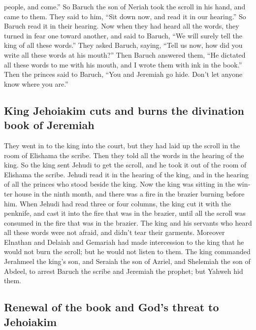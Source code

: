 \begin{paracol}{2}
\begin{otherlanguage}{english}
people, and come.'' So Baruch the son of Neriah took the scroll in his
hand, and came to them.  They said to him, ``Sit down
now, and read it in our hearing.'' So Baruch read it in their hearing.
 Now when they had heard all the words, they turned in
fear one toward another, and said to Baruch, ``We will surely tell the
king of all these words.''  They asked Baruch, saying,
``Tell us now, how did you write all these words at his mouth?''
 Then Baruch answered them, ``He dictated all these words
to me with his mouth, and I wrote them with ink in the book.''
 Then the princes said to Baruch, ``You and Jeremiah go
hide. Don't let anyone know where you are.''

\hypertarget{king-jehoiakim-cuts-and-burns-the-divination-book-of-jeremiah}{%
\subsection{King Jehoiakim cuts and burns the divination book of
Jeremiah}\label{king-jehoiakim-cuts-and-burns-the-divination-book-of-jeremiah}}

 They went in to the king into the court, but they had
laid up the scroll in the room of Elishama the scribe. Then they told
all the words in the hearing of the king.  So the king
sent Jehudi to get the scroll, and he took it out of the room of
Elishama the scribe. Jehudi read it in the hearing of the king, and in
the hearing of all the princes who stood beside the king.
 Now the king was sitting in the winter house in the
ninth month, and there was a fire in the brazier burning before him.
 When Jehudi had read three or four columns, the king cut
it with the penknife, and cast it into the fire that was in the brazier,
until all the scroll was consumed in the fire that was in the brazier.
 The king and his servants who heard all these words were
not afraid, and didn't tear their garments.  Moreover
Elnathan and Delaiah and Gemariah had made intercession to the king that
he would not burn the scroll; but he would not listen to them.
 The king commanded Jerahmeel the king's son, and Seraiah
the son of Azriel, and Shelemiah the son of Abdeel, to arrest Baruch the
scribe and Jeremiah the prophet; but Yahweh hid them.

\hypertarget{renewal-of-the-book-and-gods-threat-to-jehoiakim}{%
\subsection{Renewal of the book and God's threat to
Jehoiakim}\label{renewal-of-the-book-and-gods-threat-to-jehoiakim}}


\end{otherlanguage}
\end{paracol}
